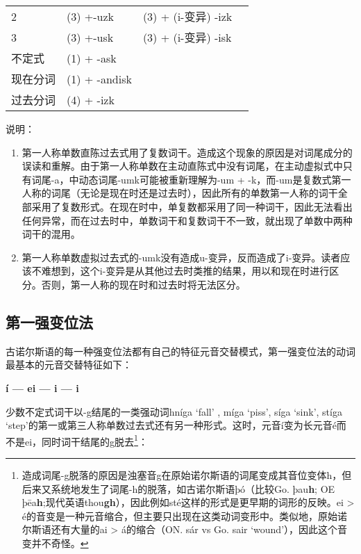 \begin{longtable}{llll}
    2          & (3) +-uzk                             & (3) + (i-变异) -izk                   &                       \\
    3          & (3) +-usk                             & (3) + (i-变异) -isk                   &                       \\
    不定式     & (1) + -ask                            &                                       &                       \\
    现在分词   & (1) + -andisk                         &                                       &                       \\
    过去分词   & (4) + -izk                            &                                       &                       \\
\end{longtable}

说明：

\begin{enumerate}
    \item
          \label{_Ref117719619}{}第一人称单数直陈过去式用了复数词干。造成这个现象的原因是对词尾成分的误读和重解。由于第一人称单数在主动直陈式中没有词尾，在主动虚拟式中只有词尾-a，中动态词尾-umk可能被重新理解为-um + -k，而-um是复数式第一人称的词尾（无论是现在时还是过去时），因此所有的单数第一人称的词干全部采用了复数形式。在现在时中，单复数都采用了同一种词干，因此无法看出任何异常，而在过去时中，单数词干和复数词干不一致，就出现了单数中两种词干的混用。
    \item
          第一人称单数虚拟过去式的-umk没有造成u-变异，反而造成了i-变异。读者应该不难想到，这个i-变异是从其他过去时类推的结果，用以和现在时进行区分。否则，第一人称的现在时和过去时将无法区分。
\end{enumerate}

\subsection{第一强变位法}\label{第一强变位法}

古诺尔斯语的每一种强变位法都有自己的特征元音交替模式，第一强变位法的动词最基本的元音交替特征如下：

\begin{center}
    \textbf{í --- ei --- i --- i}
\end{center}


少数不定式词干以-g结尾的一类强动词hníga `fall' , míga `piss', síga
`sink', stíga `step'的第一或第三人称单数过去式还有另一种形式。这时，元音í变为长元音é而不是ei，同时词干结尾的g脱去\footnote{造成词尾-g脱落的原因是浊塞音g在原始诺尔斯语的词尾变成其音位变体h，但后来又系统地发生了词尾-h的脱落，如古诺尔斯语þó（比较Go. þau\textbf{h}; OE þēa\textbf{h};现代英语thou\textbf{gh}），因此例如sté这样的形式是更早期的词形的反映。ei > é的音变是一种元音缩合，但主要只出现在这类动词变形中。类似地，原始诺尔斯语还有大量的ai > á的缩合（ON. sár vs Go. sair `wound'），因此这个音变并不奇怪。}：

